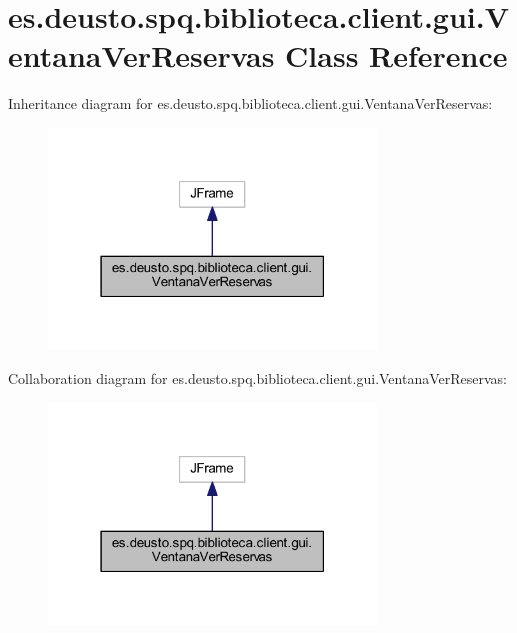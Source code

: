\hypertarget{classes_1_1deusto_1_1spq_1_1biblioteca_1_1client_1_1gui_1_1_ventana_ver_reservas}{}\section{es.\+deusto.\+spq.\+biblioteca.\+client.\+gui.\+Ventana\+Ver\+Reservas Class Reference}
\label{classes_1_1deusto_1_1spq_1_1biblioteca_1_1client_1_1gui_1_1_ventana_ver_reservas}


Inheritance diagram for es.\+deusto.\+spq.\+biblioteca.\+client.\+gui.\+Ventana\+Ver\+Reservas\+:
\nopagebreak
\begin{figure}[H]
\begin{center}
\leavevmode
\includegraphics[width=247pt]{classes_1_1deusto_1_1spq_1_1biblioteca_1_1client_1_1gui_1_1_ventana_ver_reservas__inherit__graph}
\end{center}
\end{figure}


Collaboration diagram for es.\+deusto.\+spq.\+biblioteca.\+client.\+gui.\+Ventana\+Ver\+Reservas\+:
\nopagebreak
\begin{figure}[H]
\begin{center}
\leavevmode
\includegraphics[width=247pt]{classes_1_1deusto_1_1spq_1_1biblioteca_1_1client_1_1gui_1_1_ventana_ver_reservas__coll__graph}
\end{center}
\end{figure}
